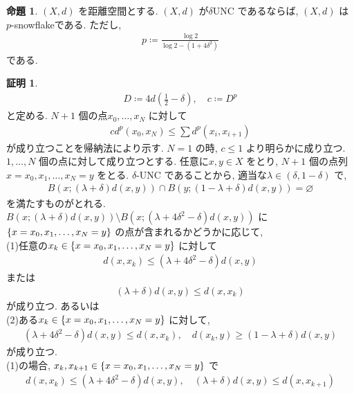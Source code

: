 \documentclass[10pt, fleqn, label-section=none]{bxjsarticle}
\theoremstyle{definition}
\newtheorem{prop}[dfn]{命題}
\newtheorem*{pf*}{証明}
\newcommand{\cbra}[1]{\mleft\{#1\mright\}}
\renewcommand{\;}{\, ; \,}
\begin{document}
\begin{prop}$(X, d)$ を距離空間とする. $(X, d)$ が$\delta $UNC であるならば, 
 $(X, d)$ は $p$-snowflakeである. ただし, 
 \begin{align*} p \coloneqq \frac{\log 2}{\log 2 - (1 + 4 \delta ^2)} \end{align*}
 である. 
\end{prop}
\begin{pf*}
\begin{align*} D \coloneqq 4d(\frac{1}{2} - \delta) , \quad  c \coloneqq D ^p \end{align*}
と定める. $N + 1$ 個の点$x_0, \ldots, x_N$ に対して
\begin{align*} c d^p(x_0, x_N) \leq \sum d^p(x_{i}, x_{i + 1}) \end{align*}
が成り立つことを帰納法により示す. $N = 1$ の時, $c \leq 1$ より明らかに成り立つ. $1, \ldots, N$ 個の点に対して成り立つとする. 任意に$x, y \in X$ をとり, $N + 1$ 個の点列$x = x_0, x_1, \ldots , x_N = y$ をとる. $\delta $-UNC であることから, 適当な$\lambda \in (\delta , 1- \delta)$ で, 
\begin{align*} B(x;  (\lambda + \delta) d(x, y)) \cap B(y; (1 - \lambda + \delta) d(x, y)) = \varnothing \end{align*}
を満たすものがとれる. $B(x; (\lambda + \delta) d(x, y) ) \setminus B(x; (\lambda + 4\delta^2 - \delta) d(x, y) )$ に$\cbra{x = x_0, x_1, \ldots, x_N = y}$ の点が含まれるかどうかに応じて, 
\\(1)任意の$x_k \in \cbra{x = x_0, x_1, \ldots, x_N = y}$ に対して
\begin{align*} d(x, x_k) \leq (\lambda + 4 \delta ^2 - \delta) d(x, y) \end{align*} または
\begin{align*}  (\lambda + \delta) d(x, y) \leq d(x, x_k) \end{align*}
が成り立つ. 
あるいは
\\(2)ある$x_k \in \cbra{x = x_0, x_1, \ldots, x_N = y}$ に対して, 
\begin{align*} (\lambda + 4 \delta ^2 - \delta )d(x, y) \leq d(x, x_k), \quad d(x_k, y) \geq (1 - \lambda + \delta ) d(x, y)\end{align*}
が成り立つ. \\
(1)の場合, $x_{k}, x_{k + 1} \in \cbra{x = x_0, x_1, \ldots, x_N = y}$ で
\begin{align*} d(x, x_{k}) \leq (\lambda + 4 \delta ^2 - \delta) d(x, y), \quad (\lambda + \delta ) d(x, y) \leq d(x, x_{k+ 1})\end{align*}

\end{pf*}
\end{document}
